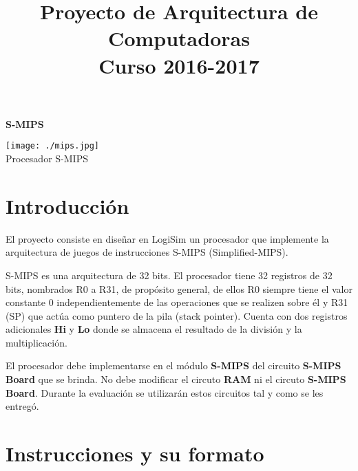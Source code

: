 \documentclass[letterpaper,11pt]{scrartcl}
\title{Proyecto de Arquitectura de Computadoras \\ \small{Curso 2016-2017}}
\date{}
\author{}
\begin{document}
\pagestyle{empty}

\setlength{\parskip}{0.1em}

\maketitle
\thispagestyle{empty}

\vspace{-2.5cm}
\begin{center}
 \huge{\textbf{S-MIPS}}
\end{center}
\vspace{0.5cm}

\begin{center}
\texttt{[image: ./mips.jpg]}\\
Procesador S-MIPS
\end{center}

\section*{Introducción}

El proyecto consiste en diseñar en LogiSim un procesador que implemente la arquitectura 
de juegos de instrucciones S-MIPS (Simplified-MIPS).

S-MIPS es una arquitectura de 32 bits.  El procesador tiene 32 registros de
32 bits, nombrados R0 a R31, de propósito general, de ellos R0 siempre tiene el valor constante 0
independientemente de las operaciones que se realizen sobre él y R31 (SP)
que actúa como puntero de la pila (stack pointer). Cuenta con dos registros adicionales
\textbf{Hi} y  \textbf{Lo} donde se almacena el resultado de la división y la multiplicación.

El procesador debe implementarse en el módulo \textbf{S-MIPS} del circuito \textbf{S-MIPS Board} que se brinda.
No debe modificar el circuto \textbf{RAM} ni el circuto \textbf{S-MIPS Board}. Durante la evaluación se utilizarán
estos circuitos tal y como se les entregó.

\section*{Instrucciones y su formato}
\end{document}
